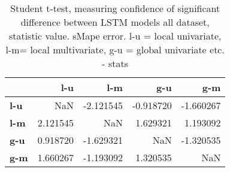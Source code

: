\begin{table}[h]
\centering
\caption{Student t-test, measuring confidence of significant difference between LSTM models all dataset, statistic value. sMape error.  l-u = local univariate, l-m= local multivariate, g-u = global univariate etc. - stats}
\label{table:ttest-stats-lstm-experiments-sMAPE-all-dataset}
\begin{tabular}{lrrrr}
\toprule
{} &       l-u &       l-m &       g-u &       g-m \\
\midrule
\textbf{l-u} &       NaN & -2.121545 & -0.918720 & -1.660267 \\
\textbf{l-m} &  2.121545 &       NaN &  1.629321 &  1.193092 \\
\textbf{g-u} &  0.918720 & -1.629321 &       NaN & -1.320535 \\
\textbf{g-m} &  1.660267 & -1.193092 &  1.320535 &       NaN \\
\bottomrule
\end{tabular}
\end{table}
